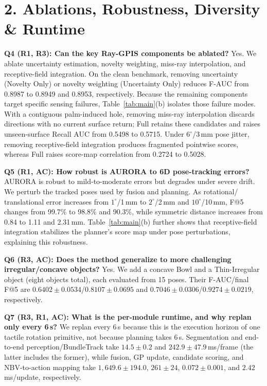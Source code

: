 \documentclass[conference]{IEEEtran}
\begin{document}
\section*{2. Ablations, Robustness, Diversity \& Runtime}

\textbf{Q4 (R1, R3): Can the key Ray-GPIS components be ablated?}
Yes. We ablate uncertainty estimation, novelty weighting, miss-ray
interpolation, and receptive-field integration. On the clean benchmark,
removing uncertainty (Novelty Only) or novelty weighting (Uncertainty Only)
reduces F-AUC from 0.8987 to 0.8949 and 0.8953, respectively. Because the
remaining components target specific sensing failures, Table~\ref{tab:main}(b)
isolates those failure modes.
With a contiguous palm-induced hole, removing miss-ray interpolation discards
directions with no current surface return; Full retains these candidates and
raises unseen-surface Recall AUC from 0.5498 to 0.5715. Under
$6^\circ$/3\,mm pose jitter, removing receptive-field integration produces
fragmented pointwise scores, whereas Full raises score-map correlation from
0.2724 to 0.5028.

\textbf{Q5 (R1, AC): How robust is AURORA to 6D pose-tracking errors?}
AURORA is robust to mild-to-moderate errors but degrades under severe drift. We
perturb the tracked poses used by fusion and planning. As rotational/
translational error increases from $1^\circ$/1\,mm to $2^\circ$/2\,mm and
$10^\circ$/10\,mm, F@5 changes from 99.7\% to 98.8\% and 90.3\%, while
symmetric distance increases from 0.84 to 1.11 and 2.31\,mm.
Table~\ref{tab:main}(b) further shows that
receptive-field integration stabilizes the planner's score map under pose
perturbations, explaining this robustness.

\textbf{Q6 (R3, AC): Does the method generalize to more challenging
irregular/concave objects?} Yes. We add a concave Bowl and a Thin-Irregular
object (eight objects total), each evaluated from 15 poses. Their F-AUC/final
F@5 are $0.6402{\pm}0.0534$/$0.8107{\pm}0.0695$ and
$0.7046{\pm}0.0306$/$0.9274{\pm}0.0219$, respectively.

\textbf{Q7 (R3, R1, AC): What is the per-module runtime, and why replan
only every 6\,s?} We replan every 6\,s because this is the execution horizon of
one tactile rotation primitive, not because planning takes 6\,s. Segmentation
and end-to-end perception/BundleTrack take
$14.5{\pm}0.2$ and $242.9{\pm}47.9$\,ms/frame (the latter includes the former),
while fusion, GP update, candidate scoring, and NBV-to-action mapping take
$1,649.6{\pm}194.0$, $261{\pm}24$, $0.072{\pm}0.001$, and $2.42$\,ms/update,
respectively.
\end{document}
